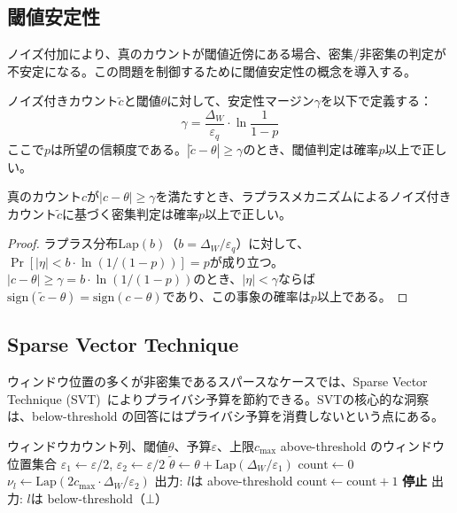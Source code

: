 \subsection{閾値安定性}

ノイズ付加により、真のカウントが閾値近傍にある場合、密集/非密集の判定が不安定になる。この問題を制御するために閾値安定性の概念を導入する。

\begin{definition}\label{def:stability}
ノイズ付きカウント$\tilde{c}$と閾値$\theta$に対して、安定性マージン$\gamma$を以下で定義する：
\[
\gamma = \frac{\Delta_W}{\varepsilon_q} \cdot \ln\frac{1}{1 - p}
\]
ここで$p$は所望の信頼度である。$|\tilde{c} - \theta| \geq \gamma$のとき、閾値判定は確率$p$以上で正しい。
\end{definition}

\begin{theorem}[閾値安定性保証]\label{thm:stability}
真のカウント$c$が$|c - \theta| \geq \gamma$を満たすとき、ラプラスメカニズムによるノイズ付きカウント$\tilde{c}$に基づく密集判定は確率$p$以上で正しい。
\end{theorem}

\begin{proof}
ラプラス分布$\text{Lap}(b)$（$b = \Delta_W / \varepsilon_q$）に対して、$\Pr[|\eta| < b \cdot \ln(1/(1-p))] = p$が成り立つ。
$|c - \theta| \geq \gamma = b \cdot \ln(1/(1-p))$のとき、$|\eta| < \gamma$ならば$\text{sign}(\tilde{c} - \theta) = \text{sign}(c - \theta)$であり、この事象の確率は$p$以上である。
\end{proof}

\subsection{Sparse Vector Technique}

ウィンドウ位置の多くが非密集であるスパースなケースでは、Sparse Vector Technique (SVT)~\cite{dwork2009complexity,lyu2017understanding}によりプライバシ予算を節約できる。SVTの核心的な洞察は、below-threshold の回答にはプライバシ予算を消費しないという点にある。

\begin{algorithm}[t]
\caption{SVT-DIM: SVTによるDP密集区間検出}\label{alg:svt-dim}
\begin{algorithmic}[1]
\REQUIRE ウィンドウカウント列、閾値$\theta$、予算$\varepsilon$、上限$c_\text{max}$
\ENSURE above-threshold のウィンドウ位置集合
\STATE $\varepsilon_1 \leftarrow \varepsilon / 2$, $\varepsilon_2 \leftarrow \varepsilon / 2$
\STATE $\tilde{\theta} \leftarrow \theta + \text{Lap}(\Delta_W / \varepsilon_1)$ \hfill{}
\STATE $\text{count} \leftarrow 0$
  \STATE $\nu_l \leftarrow \text{Lap}(2c_\text{max} \cdot \Delta_W / \varepsilon_2)$ \hfill{}
    \STATE 出力: $l$は above-threshold
    \STATE $\text{count} \leftarrow \text{count} + 1$
      \STATE \textbf{停止}
    \ENDIF
  \ELSE
    \STATE 出力: $l$は below-threshold（$\bot$）
  \ENDIF
\ENDFOR
\end{algorithmic}
\end{algorithm}

